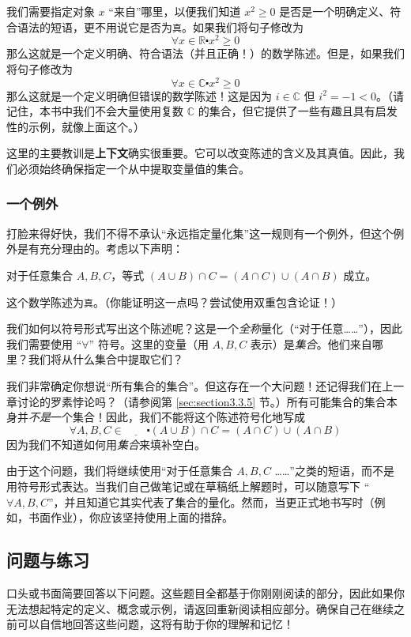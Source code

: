 我们需要指定对象 $x$ ``来自''哪里，以便我们知道 $x^2 \ge 0$ 是否是一个明确定义、符合语法的短语，更不用说它是否为\verb|真|。如果我们将句子修改为
\[\forall x \in \mathbb{R} \centerdot x^2 \ge 0\]
那么这就是一个定义明确、符合语法（并且正确！）的数学陈述。但是，如果我们将句子修改为
\[\forall x \in \mathbb{C} \centerdot x^2 \ge 0\]
那么这就是一个定义明确但错误的数学陈述！这是因为 $i \in \mathbb{C}$ 但 $i^2 = -1 < 0$。（请记住，本书中我们不会大量使用复数 $\mathbb{C}$ 的集合，但它提供了一些有趣且具有启发性的示例，就像上面这个。）

这里的主要教训是\textbf{上下文}确实很重要。它可以改变陈述的含义及其真值。因此，我们必须始终确保指定一个从中提取变量值的集合。

\subsubsection*{一个例外}

打脸来得好快，我们不得不承认``永远指定量化集''这一规则有一个例外，但这个例外是有充分理由的。考虑以下声明：
\begin{center}
    对于任意集合 $A, B,C$，等式 $(A \cup B) \cap C = (A \cap C) \cup (A \cap B)$ 成立。
\end{center}
这个数学陈述为\verb|真|。（你能证明这一点吗？尝试使用双重包含论证！）

我们如何以符号形式写出这个陈述呢？这是一个\emph{全称}量化（``对于任意……''），因此我们需要使用 ``$\forall$'' 符号。这里的变量（用 $A,B,C$ 表示）是\emph{集合}。他们来自哪里？我们将从什么集合中提取它们？

我们非常确定你想说``所有集合的集合''。但这存在一个大问题！还记得我们在上一章讨论的罗素悖论吗？（请参阅第 \ref{sec:section3.3.5} 节。）所有可能集合的集合本身并\emph{不是}一个集合！因此，我们不能将这个陈述符号化地写成
\[\forall A, B,C \in \underline{\qquad} \centerdot (A \cup B) \cap C = (A \cap C) \cup (A \cap B)\]
因为我们不知道如何用\emph{集合}来填补空白。

由于这个问题，我们将继续使用``对于任意集合 $A,B,C$ ……''之类的短语，而不是用符号形式表达。当我们自己做笔记或在草稿纸上解题时，可以随意写下 ``$\forall A,B,C$''，并且知道它其实代表了集合的量化。然而，当更正式地书写时（例如，书面作业），你应该坚持使用上面的措辞。

\subsection{问题与练习}

口头或书面简要回答以下问题。这些题目全都基于你刚刚阅读的部分，因此如果你无法想起特定的定义、概念或示例，请返回重新阅读相应部分。确保自己在继续之前可以自信地回答这些问题，这将有助于你的理解和记忆！

